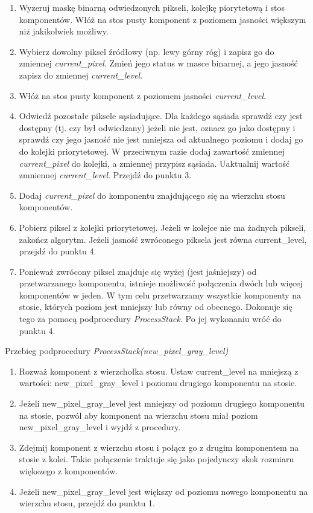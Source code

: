 \begin{enumerate} \item Wyzeruj maskę binarną odwiedzonych pikseli, kolejkę
    piorytetową i stos komponentów. Włóż na stos pusty komponent z poziomem
    jasności większym niż jakikolwiek możliwy. \item Wybierz dowolny piksel
    źródłowy (np. lewy górny róg) i zapisz go do zmiennej
    \textit{current\_pixel}.  Zmień jego status w masce binarnej, a jego
    jasność zapisz do zmiennej \textit{current\_level}. \item Włóż na stos
    pusty komponent z poziomem jasności \textit{current\_level}. \item Odwiedź
    pozostałe piksele sąsiadujące. Dla każdego sąsiada sprawdź czy jest
    dostępny (tj. czy był odwiedzany) jeżeli nie jest, oznacz go jako dostępny
    i sprawdź czy jego jasność nie jest mniejsza od aktualnego poziomu i dodaj
    go do kolejki priorytetowej. W przeciwnym razie dodaj zawartość zmiennej
    \textit{current\_pixel} do kolejki, a zmiennej przypisz sąsiada. Uaktualnij
    wartość zmniennej \textit{current\_level}. Przejdź do punktu 3. \item Dodaj
    \textit{current\_pixel} do komponentu znajdującego się na wierzchu stosu
    komponentów. \item Pobierz piksel z kolejki priorytetowej.  Jeżeli w
    kolejce nie ma żadnych pikseli, zakończ algorytm. Jeżeli jasność zwróconego
    piksela jest równa current\_level, przejdź do punktu 4. \item Ponieważ
    zwrócony piksel znajduje się wyżej (jest jaśniejszy) od przetwarzanego
    komponentu, istnieje możliwość połączenia dwóch lub więcej komponentów w
    jeden. W tym celu przetwarzamy wszystkie komponenty na stosie, których
    poziom jest mniejszy lub równy od obecnego. Dokonuje się tego za pomocą
    podprocedury \textit{ProcessStack}. Po jej wykonaniu wróć do punktu 4.
\end{enumerate}

Przebieg podprocedury \textit{ProcessStack(new\_pixel\_gray\_level)}
\begin{enumerate} \item Rozważ komponent z wierzchołka stosu. Ustaw
    current\_level na mniejszą z wartości: new\_pixel\_gray\_level i poziomu
    drugiego komponentu na stosie. \item Jeżeli new\_pixel\_gray\_level jest
    mniejszy od poziomu drugiego komponentu na stosie, pozwól aby komponent na
    wierzchu stosu miał poziom new\_pixel\_gray\_level i wyjdź z procedury.
  \item Zdejmij komponent z wierzchu stosu i połącz go z drugim komponentem na
    stosie z kolei.  Takie połączenie traktuje się jako pojedynczy skok
    rozmiaru większego z komponentów.  \item Jeżeli new\_pixel\_gray\_level
    jest większy od poziomu nowego komponentu na wierzchu stosu, przejdź do
    punktu 1.  \end{enumerate}

